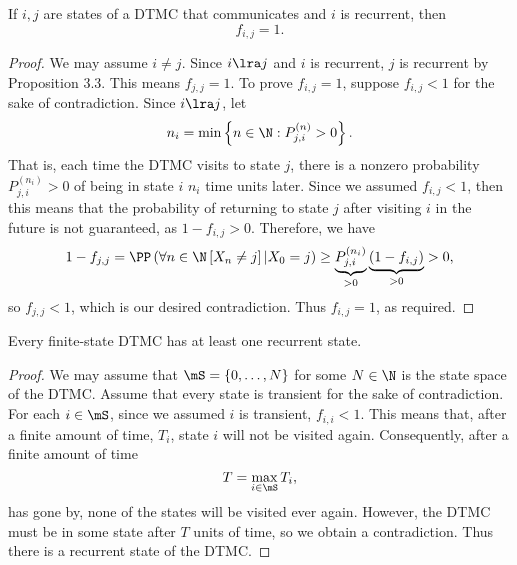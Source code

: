 \documentclass[stat333]{subfiles}
\begin{document}
    \begin{prop}{}
        If $i,j$ are states of a DTMC that communicates and $i$ is recurrent, then
        \begin{equation*}
            f_{i,j} = 1.
        \end{equation*}
    \end{prop}

    \begin{proof}
        We may assume $i\neq j$. Since $i\lra j$ and $i$ is recurrent, $j$ is recurrent by Proposition 3.3. This means $f_{j,j}=1$. To prove $f_{i,j}=1$, suppose $f_{i,j}<1$ for the sake of contradiction. Since $i\lra j$, let
        \begin{equation*}
            n_i = \min\left\lbrace n\in\N: P^{\left( n \right)}_{j,i}>0 \right\rbrace.
        \end{equation*}
        That is, each time the DTMC visits to state $j$, there is a nonzero probability $P^{\left( n_i \right)}_{j,i}>0$ of being in state $i$ $n_i$ time units later. Since we assumed $f_{i,j}<1$, then this means that the probability of returning to state $j$ after visiting $i$ in the future is not guaranteed, as $1-f_{i,j}>0$. Therefore, we have
        \begin{equation*}
            1-f_{j,j} = \PP\left( \forall n\in\N\left[ X_n\neq j \right]|X_0=j \right) \geq \underbrace{P^{\left( n_i \right)}_{j,i}}_{>0}\underbrace{\left( 1-f_{i,j} \right)}_{>0} > 0,
        \end{equation*}
        so $f_{j,j}<1$, which is our desired contradiction. Thus $f_{i,j}=1$, as required.
    \end{proof}

    \begin{prop}{}
        Every finite-state DTMC has at least one recurrent state.
    \end{prop}

    \begin{proof}
        We may assume that $\mS = \left\lbrace 0,\ldots,N \right\rbrace$ for some $N\in\N$ is the state space of the DTMC. Assume that every state is transient for the sake of contradiction. For each $i\in\mS$, since we assumed $i$ is transient, $f_{i,i}<1$. This means that, after a finite amount of time, $T_i$, state $i$ will not be visited again. Consequently, after a finite amount of time
        \begin{equation*}
            T = \max_{i\in\mS}T_i,
        \end{equation*}
        has gone by, none of the states will be visited ever again. However, the DTMC must be in some state after $T$ units of time, so we obtain a contradiction. Thus there is a recurrent state of the DTMC.
    \end{proof}
\end{document}
